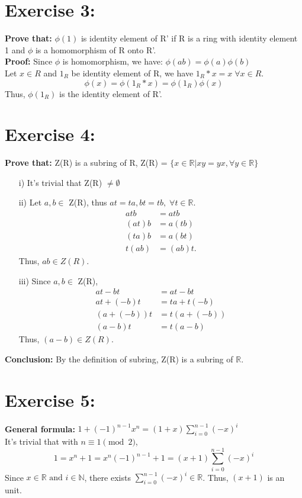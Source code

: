 \documentclass{article}
\newcommand{\N}{\mathbb{N}}
\newcommand{\R}{\mathbb{R}}
\begin{document}
	\section{Exercise 3:}
		\textbf{Prove that:} $\phi(1)$ is identity element of R' if R is a ring with identity element 1 and $\phi$ is a homomorphism of R onto R'.\\
		\textbf{Proof:} Since $\phi$ is homomorphism, we have: $\phi(ab) = \phi(a)\phi(b)$\\
		Let $x \in R$ and $1_R$ be identity element of R, we have $1_R * x = x \; \forall x \in R$. 
		\begin{equation*}
			\phi(x) = \phi(1_R*x) = \phi(1_R)\phi(x)
		\end{equation*}
		Thus, $\phi(1_R)$ is the identity element of R'.
	\section{Exercise 4:}
		\textbf{Prove that:} Z(R) is a subring of R, Z(R) = $\{x \in \R \vert xy = yx, \forall y \in \R\}$
		\begin{enumerate}
			\item [i)]
				It's trivial that Z(R) $\neq \emptyset$
			\item [ii)]
				Let $a, b \in$ Z(R), thus $at = ta, bt = tb, \; \forall t \in \R$.
				\begin{align*}
					atb &= atb\\
					(at)b &= a(tb)\\
					(ta)b &= a(bt)\\
					t(ab) &= (ab)t.
				\end{align*}
				Thus, $ab \in Z(R)$.
			\item [iii)]
				Since $a, b \in$ Z(R),
				\begin{align*}
					at - bt &= at - bt\\
					at + (-b)t &= ta + t(-b)\\
					(a+(-b))t &= t(a + (-b))\\
					(a-b)t &= t(a-b)
				\end{align*}
				Thus, $(a-b) \in Z(R)$.\\
		\end{enumerate}
		\textbf{Conclusion:} By the definition of subring, Z(R) is a subring of $\R$.
		
	\section{Exercise 5:}
		\textbf{General formula:} $1 + (-1)^{n-1}x^n = (1+x)\sum_{i=0}^{n-1}(-x)^i$\\
		It's trivial that with $n \equiv 1 \pmod 2$,
		\begin{equation*}
			1 = x^n + 1 = x^n(-1)^{n-1} + 1 = (x+1)\sum_{i=0}^{n-1} (-x)^i
		\end{equation*}
		Since $x \in \R \mbox{ and } i \in \N$, there exists $\sum_{i=0}^{n-1} (-x)^i \in \R$. Thus, $(x+1)$ is an unit.
		
\end{document}
